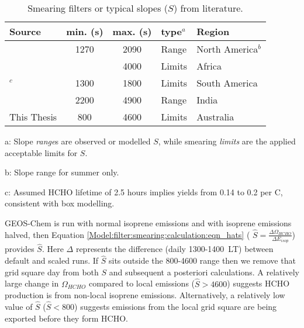       \begin{table}\begin{threeparttable}
        \caption{Smearing filters or typical slopes ($S$) from literature.}
        \begin{tabular}{ l | c  c  l  >{\centering\arraybackslash}p{3cm} } 
          \toprule
          Source & min. (s) & max. (s) & type$^a$ & Region \\
          \midrule
          \textcite{Palmer2003}      & 1270 & 2090 & Range & North America$^{b}$ \\
          \textcite{Marais2012}      &      & 4000 & Limits & Africa \\
          \textcite{Barkley2013}$^c$ & 1300 & 1800 & Limits & South America \\
          \textcite{Surl2018}        & 2200 & 4900 & Range & India \\
          This Thesis             & 800  & 4600 & Limits & Australia \\
          \bottomrule
        \end{tabular}
        \begin{tablenotes} 
          \item a: Slope \textit{range}s are observed or modelled $S$, while smearing \textit{limits} are the applied acceptable limits for $S$. 
          \item b: Slope range for summer only.
          \item c: Assumed HCHO lifetime of 2.5 hours implies yields from 0.14 to 0.2 per C, consistent with box modelling.
        \end{tablenotes}
        \label{Model:filter:smearing:tab_smearing_ranges}
      \end{threeparttable}\end{table}
      
      
      
      GEOS-Chem is run with normal isoprene emissions and with isoprene emissions halved, then Equation \ref{Model:filter:smearing:calculation:eqn_hats} ( $\hat{S} = \frac{\Delta \Omega_{HCHO}}{\Delta E_{isop}} $) provides $\hat{S}$.
      Here $\Delta$ represents the difference (daily 1300-1400~LT) between default and scaled runs.
      If $\hat{S}$ sits outside the 800-4600 range then we remove that grid square day from both $S$ and subsequent a posteriori calculations.
      A relatively large change in $\Omega_{HCHO}$ compared to local emissions ($\hat{S}>4600$) suggests HCHO production is from non-local isoprene emissions.
      Alternatively, a relatively low value of $\hat{S}$ ($\hat{S}<800$) suggests emissions from the local grid square are being exported before they form HCHO.
      
